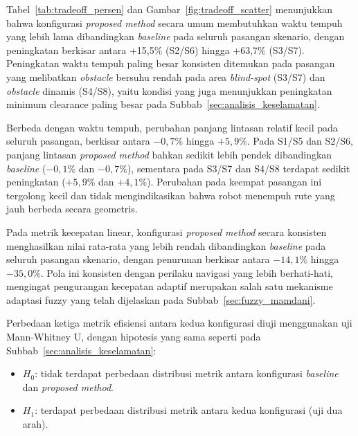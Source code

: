 Tabel~\ref{tab:tradeoff_persen} dan Gambar~\ref{fig:tradeoff_scatter}
menunjukkan bahwa konfigurasi \textit{proposed method} secara umum
membutuhkan waktu tempuh yang lebih lama dibandingkan \textit{baseline}
pada seluruh pasangan skenario, dengan peningkatan berkisar antara
+15,5\% (S2/S6) hingga +63,7\% (S3/S7). Peningkatan waktu tempuh paling
besar konsisten ditemukan pada pasangan yang melibatkan \textit{obstacle}
bersuhu rendah pada area \textit{blind-spot} (S3/S7) dan \textit{obstacle}
dinamis (S4/S8), yaitu kondisi yang juga menunjukkan peningkatan minimum
clearance paling besar pada Subbab~\ref{sec:analisis_keselamatan}.

Berbeda dengan waktu tempuh, perubahan panjang lintasan relatif kecil pada
seluruh pasangan, berkisar antara $-0,7\%$ hingga $+5,9\%$. Pada S1/S5 dan
S2/S6, panjang lintasan \textit{proposed method} bahkan sedikit lebih
pendek dibandingkan \textit{baseline} ($-0,1\%$ dan $-0,7\%$), sementara
pada S3/S7 dan S4/S8 terdapat sedikit peningkatan ($+5,9\%$ dan $+4,1\%$).
Perubahan pada keempat pasangan ini tergolong kecil dan tidak
mengindikasikan bahwa robot menempuh rute yang jauh berbeda secara
geometris.

Pada metrik kecepatan linear, konfigurasi \textit{proposed method} secara
konsisten menghasilkan nilai rata-rata yang lebih rendah dibandingkan
\textit{baseline} pada seluruh pasangan skenario, dengan penurunan berkisar
antara $-14,1\%$ hingga $-35,0\%$. Pola ini konsisten dengan perilaku
navigasi yang lebih berhati-hati, mengingat pengurangan kecepatan adaptif
merupakan salah satu mekanisme adaptasi fuzzy yang telah dijelaskan pada
Subbab~\ref{sec:fuzzy_mamdani}.

Perbedaan ketiga metrik efisiensi antara kedua konfigurasi diuji
menggunakan uji Mann-Whitney U, dengan hipotesis yang sama seperti pada
Subbab~\ref{sec:analisis_keselamatan}:
\begin{itemize}
    \item $H_0$: tidak terdapat perbedaan distribusi metrik antara
    konfigurasi \textit{baseline} dan \textit{proposed method}.
    \item $H_1$: terdapat perbedaan distribusi metrik antara kedua
    konfigurasi (uji dua arah).
\end{itemize}

